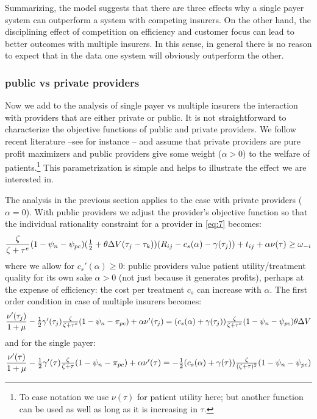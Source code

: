 \documentclass[a4paper,12pt]{article}
\begin{document}
Summarizing, the model suggests that there are three effects why a single payer system can outperform a system with competing insurers. On the other hand, the disciplining effect of competition on efficiency and customer focus can lead to better outcomes with multiple insurers. In this sense, in general there is no reason to expect that in the data one system will obviously outperform the other.

\subsubsection{public vs private providers}
\label{sec:org7ebd7d6}

Now we add to the analysis of single payer vs multiple insurers the interaction with providers that are either private or public. It is not straightforward to characterize the objective functions of public and private providers. We follow recent literature --see for instance \cite{Brekke2018}-- and assume that private providers are pure profit maximizers and public providers give some weight (\(\alpha > 0\)) to the welfare of patients.\footnote{To ease notation we use \(\nu(\tau)\) for patient utility here; but another function can be used as well as long as it is increasing in \(\tau\).} This parametrization is simple and helps to illustrate the effect we are interested in.

The analysis in the previous section applies to the case with private providers (\(\alpha=0\)). With public providers we adjust the provider's objective function so that the individual rationality constraint for a provider in \eqref{eq:7} becomes:
\begin{equation}
\label{eq:7a}
\frac{\zeta}{\zeta+\tau^e}(1-\psi_n-\psi_{pc})( \textstyle{1\over 2} + \theta \Delta V (\tau_j - \tau_k))(R_{ij}-c_s(\alpha)-\gamma(\tau_j) ) + t_{ij} + \alpha \nu(\tau) \geq \omega_{-i}
\end{equation}
where we allow for \(c_s'(\alpha) \geq 0\): public providers value patient utility/treatment quality for its own sake \(\alpha>0\) (not just because it generates profits), perhaps at the expense of efficiency: the cost per treatment \(c_s\) can increase with \(\alpha\). The first order condition in case of multiple insurers becomes:
\begin{equation}
\label{eq:37public} 
\frac{\nu'(\tau_j)}{1+\mu} - \textstyle{1\over 2} \gamma'(\tau_j) \frac{\zeta}{\zeta+\tau^e}(1-\psi_n-\pi_{pc}) + \alpha \nu'(\tau_j) = (c_s(\alpha)+\gamma(\tau_j)) \frac{\zeta}{\zeta+\tau^e} (1-\psi_n -\psi_{pc})\theta \Delta V 
\end{equation}
and for the single payer:
\begin{equation}
\label{eq:37SPpublic}
 \frac{\nu'(\tau)}{1+\mu} - \textstyle{1\over 2} \gamma'(\tau) \frac{\zeta}{\zeta+\tau}(1-\psi_n-\pi_{pc}) + \alpha \nu'(\tau) = - \textstyle{1\over 2}(c_s(\alpha)+\gamma( \tau)) \frac{\zeta}{(\zeta+\tau)^2} (1-\psi_n -\psi_{pc})
\end{equation}
\end{document}
